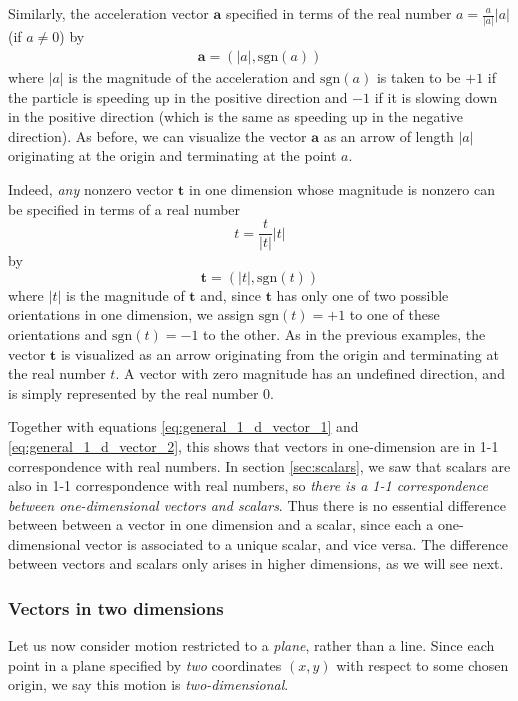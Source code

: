 \documentclass[12pt,letterpaper,reqno]{article}
\numberwithin{equation}{section}
\newcommand{\sgn}{\text{sgn}}
\begin{document}
Similarly, the acceleration vector $\mathbf{a}$  specified in terms of the real number $a=\frac{a}{|a|}|a|$ (if $a \neq 0$) by
\begin{align*}
	\mathbf{a}=(|a|,\sgn(a))
\end{align*}
where $|a|$ is the magnitude of the acceleration and $\sgn(a)$ is taken to be $+1$ if the particle is speeding up in the positive direction and $-1$ if it is slowing down in the positive direction (which is the same as speeding up in the negative direction). As before, we can visualize the vector $\mathbf{a}$ as an arrow of length $|a|$ originating at the origin and terminating at the point $a$.

Indeed, \emph{any} nonzero vector $\mathbf{t}$ in one dimension whose magnitude is nonzero can be specified in terms of a real number 
\begin{equation}\label{eq:general_1_d_vector_1}
	t=\frac{t}{|t|}|t|
\end{equation}
by
\begin{equation}\label{eq:general_1_d_vector_2}
	\mathbf{t}=(|t|,\sgn(t))
\end{equation} 
where $|t|$ is the magnitude of $\mathbf{t}$ and, since $\mathbf{t}$ has only one of two  possible orientations in one dimension, we assign $\sgn(t)=+1$ to one of these orientations and $\sgn(t)=-1$ to the other. As in the previous examples, the vector $\mathbf{t}$ is visualized as an arrow originating from the origin and terminating at the real number $t$. A vector with zero magnitude has an undefined direction, and is simply represented by the real number 0. 

Together with equations \eqref{eq:general_1_d_vector_1} and \eqref{eq:general_1_d_vector_2}, this shows that vectors in one-dimension are in 1-1 correspondence with real numbers. In section \ref{sec:scalars}, we saw that scalars are also in 1-1 correspondence with real numbers, so \emph{there is a 1-1 correspondence between one-dimensional vectors and scalars}. Thus there is no essential difference between between a vector in one dimension and a scalar, since each a one-dimensional vector is associated to a unique scalar, and vice versa. The difference between vectors and scalars only arises in higher dimensions, as we will see next.

\subsubsection{Vectors in  two dimensions}
Let us now consider motion restricted to a \emph{plane}, rather than a line. Since each point in a plane specified by \emph{two} coordinates $(x,y)$ with respect to some chosen origin, we say this motion is \emph{two-dimensional}. 
\end{document}
